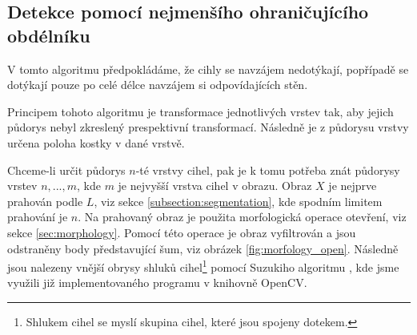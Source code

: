 \documentclass[twoside]{ctuthesis}
\begin{document}
\subsection{Detekce pomocí nejmenšího ohraničujícího obdélníku}
\label{sec:bounding_rect}
V tomto algoritmu předpokládáme, že cihly se navzájem nedotýkají, popřípadě se dotýkají pouze po celé délce navzájem si odpovídajících stěn.

Principem tohoto algoritmu je transformace jednotlivých vrstev tak, aby jejich půdorys nebyl zkreslený prespektivní transformací. Následně je z půdorysu vrstvy určena poloha kostky v dané vrstvě.

Chceme-li určit půdorys $n$-té vrstvy cihel, pak je k tomu potřeba znát půdorysy vrstev $n,...,m$, kde $m$ je nejvyšší vrstva cihel v obrazu. 
Obraz $X$ je nejprve prahován podle $L$, viz sekce \ref{subsection:segmentation}, kde spodním limitem prahování je $n$. Na prahovaný obraz je použita morfologická operace otevření, viz sekce \ref{sec:morphology}. Pomocí této operace je obraz vyfiltrován a jsou odstraněny body představující šum, viz obrázek \ref{fig:morfology_open}. Následně jsou nalezeny vnější obrysy  shluků cihel\footnote{Shlukem cihel se myslí skupina cihel, které jsou spojeny dotekem.} pomocí Suzukiho algoritmu \cite{suzuki1985topological}, kde jsme využili již implementovaného programu v knihovně OpenCV\cite{opencv_library}.
\end{document}
